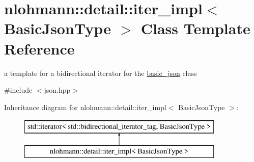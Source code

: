\hypertarget{classnlohmann_1_1detail_1_1iter__impl}{}\section{nlohmann\+:\+:detail\+:\+:iter\+\_\+impl$<$ Basic\+Json\+Type $>$ Class Template Reference}
\label{classnlohmann_1_1detail_1_1iter__impl}


a template for a bidirectional iterator for the \hyperlink{classnlohmann_1_1basic__json}{basic\+\_\+json} class  




{\ttfamily \#include $<$json.\+hpp$>$}

Inheritance diagram for nlohmann\+:\+:detail\+:\+:iter\+\_\+impl$<$ Basic\+Json\+Type $>$\+:\begin{figure}[H]
\begin{center}
\leavevmode
\includegraphics[height=2.000000cm]{classnlohmann_1_1detail_1_1iter__impl}
\end{center}
\end{figure}
